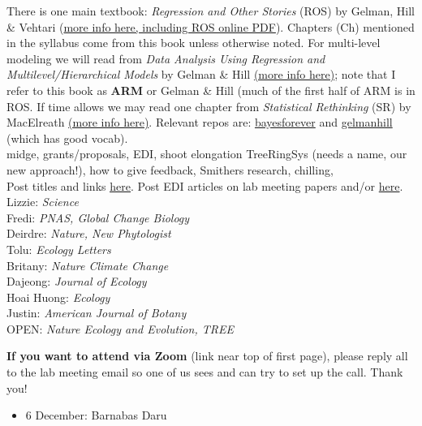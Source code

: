 \documentclass[11pt]{article}
\newenvironment{smitemize}{
\begin{itemize}
  \setlength{\itemsep}{0pt}
  \setlength{\parskip}{0.8pt}
  \setlength{\parsep}{0pt}}
{\end{itemize}
}
\begin{document}
There is one main textbook: \emph{Regression and Other Stories} (ROS) by Gelman, Hill \& Vehtari (\href{https://avehtari.github.io/ROS-Examples/}{more info here, including ROS online PDF}). Chapters (Ch) mentioned in the syllabus come from this book unless otherwise noted. For multi-level modeling we will read from \emph{Data Analysis Using Regression and Multilevel/Hierarchical Models} by Gelman \& Hill \href{http://www.stat.columbia.edu/~gelman/arm/}{(more info here)}; note that I refer to this book as {\bf ARM} or Gelman \& Hill (much of the first half of ARM is in ROS. If time allows we may read one chapter from \emph{Statistical Rethinking} (SR) by MacElreath \href{http://xcelab.net/rm/statistical-rethinking/}{(more info here)}. Relevant repos are: \href{https://github.com/temporalecologylab/bayesforever}{bayesforever} and \href{https://github.com/lizzieinvancouver/gelmanhill}{gelmanhill} (which has good vocab). \\
\vspace{6pt}
 midge, grants/proposals, EDI, shoot elongation TreeRingSys (needs a name, our new approach!), how to give feedback, Smithers research, chilling, \\
\vspace{7pt}
 Post titles and links \href{https://docs.google.com/document/d/1j0WdDbjdp8ERLSO7whvtnP-tOblYMlX33TSCXy_uRKo/edit?usp=sharing}{\underline{here}}. Post EDI articles on lab meeting papers and/or  \href{https://docs.google.com/document/d/18VbP-03oD0BsArxYm60g1ZvvFL7IoA3-6rpdHb1eLPw/edit#heading=h.gsqcglkhxkzg}{here}.\\

Lizzie: \emph{Science}\\
Fredi: \emph{PNAS, Global Change Biology}\\
Deirdre: \emph{Nature, New Phytologist}\\
Tolu: \emph{Ecology Letters}\\
Britany: \emph{Nature Climate Change}\\
Dajeong: \emph{Journal of Ecology}\\
Hoai Huong: \emph{Ecology}\\
Justin: \emph{American Journal of Botany}\\

OPEN: \emph{Nature Ecology and Evolution, TREE}\\
\vspace{6pt}

{\bf If you want to attend via Zoom} (link near top of first page), please reply all to the lab meeting email so one of us sees and can try to set up the call. Thank you!

\vspace{6pt}
\vspace{-1ex}
\begin{smitemize}
\item 6 December: Barnabas Daru
\end{smitemize}
\end{document}
